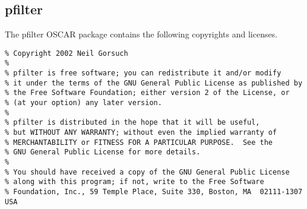 %
%
%

\subsection{pfilter}
The pfilter OSCAR package contains the following copyrights and licenses.

\begin{verbatim}
% Copyright 2002 Neil Gorsuch
%
% pfilter is free software; you can redistribute it and/or modify
% it under the terms of the GNU General Public License as published by
% the Free Software Foundation; either version 2 of the License, or
% (at your option) any later version.
%
% pfilter is distributed in the hope that it will be useful,
% but WITHOUT ANY WARRANTY; without even the implied warranty of
% MERCHANTABILITY or FITNESS FOR A PARTICULAR PURPOSE.  See the
% GNU General Public License for more details.
%
% You should have received a copy of the GNU General Public License
% along with this program; if not, write to the Free Software
% Foundation, Inc., 59 Temple Place, Suite 330, Boston, MA  02111-1307  USA
\end{verbatim}

